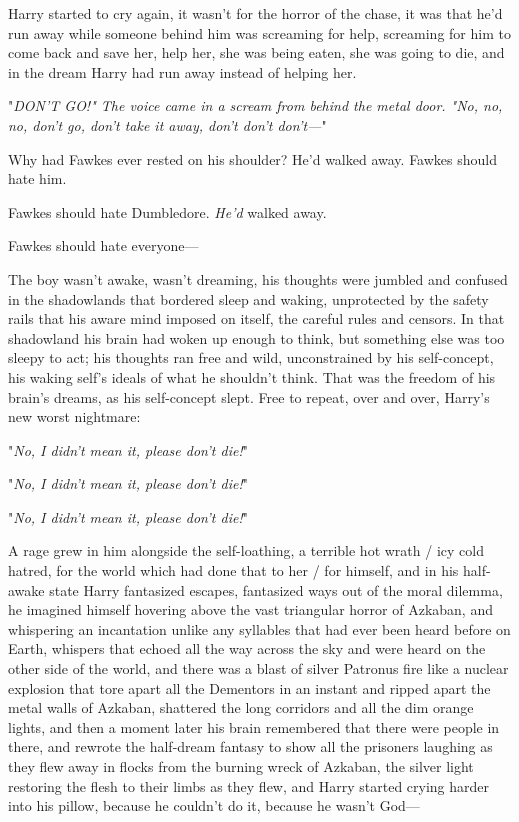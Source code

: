 Harry started to cry again, it wasn't for the horror of the chase, it was that 
he'd run away while someone behind him was screaming for help, screaming for 
him to come back and save her, help her, she was being eaten, she was going to 
die, and in the dream Harry had run away instead of helping her.

"\emph{DON'T GO!" The voice came in a scream from behind the metal door. "No, 
no, no, don't go, don't take it away, don't don't don't---}"

Why had Fawkes ever rested on his shoulder? He'd walked away. Fawkes should 
hate him.

Fawkes should hate Dumbledore. \emph{He'd} walked away.

Fawkes should hate everyone---

The boy wasn't awake, wasn't dreaming, his thoughts were jumbled and confused 
in the shadowlands that bordered sleep and waking, unprotected by the safety 
rails that his aware mind imposed on itself, the careful rules and censors. In 
that shadowland his brain had woken up enough to think, but something else was 
too sleepy to act; his thoughts ran free and wild, unconstrained by his 
self-concept, his waking self's ideals of what he shouldn't think. That was the 
freedom of his brain's dreams, as his self-concept slept. Free to repeat, over 
and over, Harry's new worst nightmare:

"\emph{No, I didn't mean it, please don't die!}"

"\emph{No, I didn't mean it, please don't die!}"

"\emph{No, I didn't mean it, please don't die!}"

A rage grew in him alongside the self-loathing, a terrible hot wrath / icy cold 
hatred, for the world which had done that to her / for himself, and in his 
half-awake state Harry fantasized escapes, fantasized ways out of the moral 
dilemma, he imagined himself hovering above the vast triangular horror of 
Azkaban, and whispering an incantation unlike any syllables that had ever been 
heard before on Earth, whispers that echoed all the way across the sky and were 
heard on the other side of the world, and there was a blast of silver Patronus 
fire like a nuclear explosion that tore apart all the Dementors in an instant 
and ripped apart the metal walls of Azkaban, shattered the long corridors and 
all the dim orange lights, and then a moment later his brain remembered that 
there were people in there, and rewrote the half-dream fantasy to show all the 
prisoners laughing as they flew away in flocks from the burning wreck of 
Azkaban, the silver light restoring the flesh to their limbs as they flew, and 
Harry started crying harder into his pillow, because he couldn't do it, because 
he wasn't God---


